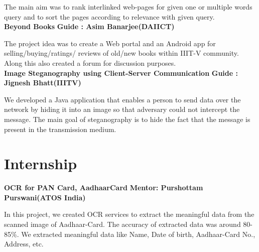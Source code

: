 \documentclass{article}
\begin{document}
\vspace*{.031mm}
\hspace*{2.6mm}The main aim was to rank interlinked web-pages for given one or multiple words query and to sort the pages according to relevance with given query.\\

\vspace*{2mm}
\textbf{\large{Beyond Books}} \hspace*{9.5cm} \textbf{Guide : Asim Banarjee(DAIICT)}

\vspace*{.031mm}
\hspace*{2.6mm} The project idea was to create a Web portal and an Android app for selling/buying/ratings/ reviews of old/new books within IIIT-V community. Along this also created a forum for discussion purposes.\\

\vspace*{2mm}
\textbf{\large{Image Steganography using Client-Server Communication}} \hspace*{1.5cm} \textbf{Guide : Jignesh Bhatt(IIITV)}

\vspace*{.031mm}
\hspace*{2.6mm} We developed a Java application that enables a person to send data over the network by hiding it into an image so that adversary could not intercept the message. The main goal of steganography is to hide the fact that the message is present in the transmission medium.


\newpage
\section{Internship}
\vspace*{2mm}
\textbf{\large{OCR for PAN Card, AadhaarCard}} \hspace*{3cm} \textbf{Mentor: Purshottam Purswani(ATOS India)}

\vspace*{.051mm}
\hspace*{2.6mm} In this project, we created OCR services to extract the meaningful data from the scanned image of Aadhaar-Card. The accuracy of extracted data was around 80-85\%. We extracted meaningful data like Name, Date of birth, Aadhaar-Card No., Address, etc.\\ %
\end{document}
